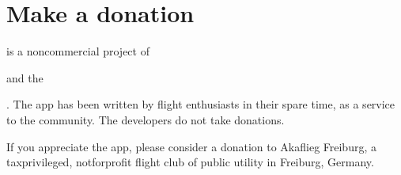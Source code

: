 \documentclass[letterpaper,10pt,english]{sphinxmanual}
\begin{document}
\chapter{Make a donation}
\label{\detokenize{02-steps/donate:make-a-donation}}\label{\detokenize{02-steps/donate::doc}}
\sphinxAtStartPar
{} is a non\sphinxhyphen{}commercial project of %
\begin{footnote}[16]\sphinxAtStartFootnote
{}
%
\end{footnote} and the %
\begin{footnote}[17]\sphinxAtStartFootnote
{}
%
\end{footnote}. The app has been written by flight enthusiasts
in their spare time, as a service to the community. The developers do not take
donations.

\sphinxAtStartPar
If you appreciate the app, please consider a donation to Akaflieg Freiburg, a
tax\sphinxhyphen{}privileged, not\sphinxhyphen{}for\sphinxhyphen{}profit flight club of public utility in Freiburg,
Germany.

\begin{sphinxVerbatim}[commandchars=\\\{\}]
         
     
     
   
\end{sphinxVerbatim}
\end{document}
